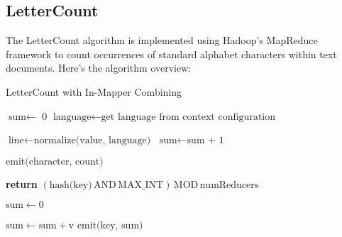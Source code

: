\subsection{LetterCount}

The LetterCount algorithm is implemented using Hadoop's MapReduce framework to count occurrences of standard alphabet characters within text documents. Here’s the algorithm overview:


\begin{algorithm}
    \caption{LetterCount with In-Mapper Combining}
    
    \begin{algorithmic}[1]
        \State $\text{sum} \gets$ 0 
        \State $\text{language} \gets \text{get language from context configuration}$

        \EndProcedure
    
        \Statex
        \State $\text{line} \gets \text{normalize(value, language)}$ 
            \State $\text{sum} \gets \text{sum + 1}$
        \EndFor
        \EndProcedure
    
        \Statex

        \State $\text{emit(character, count)}$
        \EndFor
        \EndProcedure
    \EndClass
    \end{algorithmic}
    
    \vspace{0.5cm}  %
    
    \begin{algorithmic}[1]
    \State \textbf{return} $\left(\text{hash(key)} \, \text{AND} \, \text{MAX\_INT}\right) \, \text{MOD} \, \text{numReducers}$
    \EndProcedure
    \EndClass
    \end{algorithmic}
    
    \vspace{0.5cm}  %
    
    \begin{algorithmic}[1]
       
        \State $\text{sum} \gets 0$ 
    
        
            \State $\text{sum} \gets \text{sum} + \text{v}$ 
        \EndFor
        \State $\text{emit(key, sum)}$ 
        \EndProcedure
    \EndClass
    \end{algorithmic}
    
\end{algorithm}



